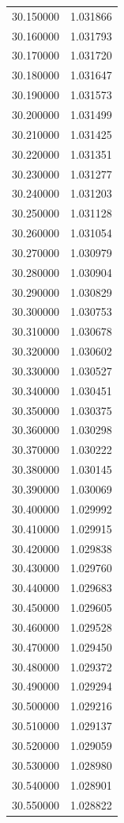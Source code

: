 \begin{tabular}{rr}
30.150000 & 1.031866 \\
30.160000 & 1.031793 \\
30.170000 & 1.031720 \\
30.180000 & 1.031647 \\
30.190000 & 1.031573 \\
30.200000 & 1.031499 \\
30.210000 & 1.031425 \\
30.220000 & 1.031351 \\
30.230000 & 1.031277 \\
30.240000 & 1.031203 \\
30.250000 & 1.031128 \\
30.260000 & 1.031054 \\
30.270000 & 1.030979 \\
30.280000 & 1.030904 \\
30.290000 & 1.030829 \\
30.300000 & 1.030753 \\
30.310000 & 1.030678 \\
30.320000 & 1.030602 \\
30.330000 & 1.030527 \\
30.340000 & 1.030451 \\
30.350000 & 1.030375 \\
30.360000 & 1.030298 \\
30.370000 & 1.030222 \\
30.380000 & 1.030145 \\
30.390000 & 1.030069 \\
30.400000 & 1.029992 \\
30.410000 & 1.029915 \\
30.420000 & 1.029838 \\
30.430000 & 1.029760 \\
30.440000 & 1.029683 \\
30.450000 & 1.029605 \\
30.460000 & 1.029528 \\
30.470000 & 1.029450 \\
30.480000 & 1.029372 \\
30.490000 & 1.029294 \\
30.500000 & 1.029216 \\
30.510000 & 1.029137 \\
30.520000 & 1.029059 \\
30.530000 & 1.028980 \\
30.540000 & 1.028901 \\
30.550000 & 1.028822 \\

\end{tabular}
